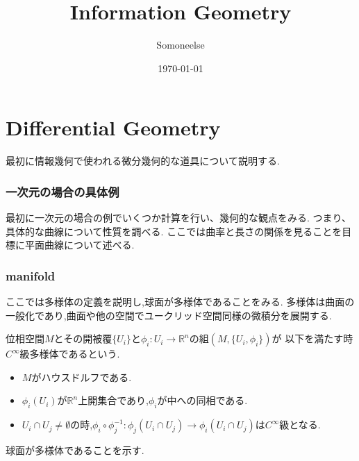 \documentclass[dvipdfmx]{ujarticle}
\title{Information Geometry}
\author{Somoneelse}
\date{\today}
\begin{document}
\maketitle
\tableofcontents

\maketitle
\part{Differential Geometry}
最初に情報幾何で使われる微分幾何的な道具について説明する.
\section{一次元の場合の具体例}
最初に一次元の場合の例でいくつか計算を行い、幾何的な観点をみる.
つまり、具体的な曲線について性質を調べる.
ここでは曲率と長さの関係を見ることを目標に平面曲線について述べる.


\section{manifold}
ここでは多様体の定義を説明し,球面が多様体であることをみる.
多様体は曲面の一般化であり,曲面や他の空間でユークリッド空間同様の微積分を展開する.

\begin{screen}
\begin{dfn}
位相空間$M$とその開被覆$\{U_i\}$と$\phi_i:U_i \to \mathbb{R}^n$の組$(M, \{U_i, \phi_i\})$が
以下を満たす時$C^{\infty}$級多様体であるという.
\begin{itemize}
  \item $M$がハウスドルフである.
  \item $\phi_i(U_i)$が$\mathbb{R}^n$上開集合であり,$\phi_i$が中への同相である.
  \item $U_i \cap U_j \neq \emptyset$の時,$\phi_i \circ \phi_j^{-1}: \phi_j(U_i \cap U_j) \to \phi_i(U_i \cap U_j)$は$C^{\infty}$級となる.
\end{itemize}
\end{dfn}
\end{screen}

球面が多様体であることを示す.
\end{document}
